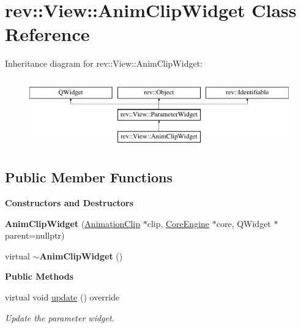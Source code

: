 \hypertarget{classrev_1_1_view_1_1_anim_clip_widget}{}\section{rev\+::View\+::Anim\+Clip\+Widget Class Reference}
\label{classrev_1_1_view_1_1_anim_clip_widget}
Inheritance diagram for rev\+::View\+::Anim\+Clip\+Widget\+:\begin{figure}[H]
\begin{center}
\leavevmode
\includegraphics[height=3.000000cm]{classrev_1_1_view_1_1_anim_clip_widget}
\end{center}
\end{figure}
\subsection*{Public Member Functions}
\begin{Indent}\textbf{ Constructors and Destructors}\par
\begin{DoxyCompactItemize}
\item 
\mbox{\label{classrev_1_1_view_1_1_anim_clip_widget_aeb08adb37ce64abe13401653f5be3e0a}} 
{\bfseries Anim\+Clip\+Widget} (\mbox{\hyperlink{classrev_1_1_animation_clip}{Animation\+Clip}} $\ast$clip, \mbox{\hyperlink{classrev_1_1_core_engine}{Core\+Engine}} $\ast$core, Q\+Widget $\ast$parent=nullptr)
\item 
\mbox{\label{classrev_1_1_view_1_1_anim_clip_widget_ad6e763eaef1f0c0d30307b6e35218fce}} 
virtual {\bfseries $\sim$\+Anim\+Clip\+Widget} ()
\end{DoxyCompactItemize}
\end{Indent}
\begin{Indent}\textbf{ Public Methods}\par
\begin{DoxyCompactItemize}
\item 
\mbox{\label{classrev_1_1_view_1_1_anim_clip_widget_a249b0df5076c57c4a0d3a590c7ad6fab}} 
virtual void \mbox{\hyperlink{classrev_1_1_view_1_1_anim_clip_widget_a249b0df5076c57c4a0d3a590c7ad6fab}{update}} () override
\begin{DoxyCompactList}\small\item\em Update the parameter widget. \end{DoxyCompactList}\end{DoxyCompactItemize}
\end{Indent}
